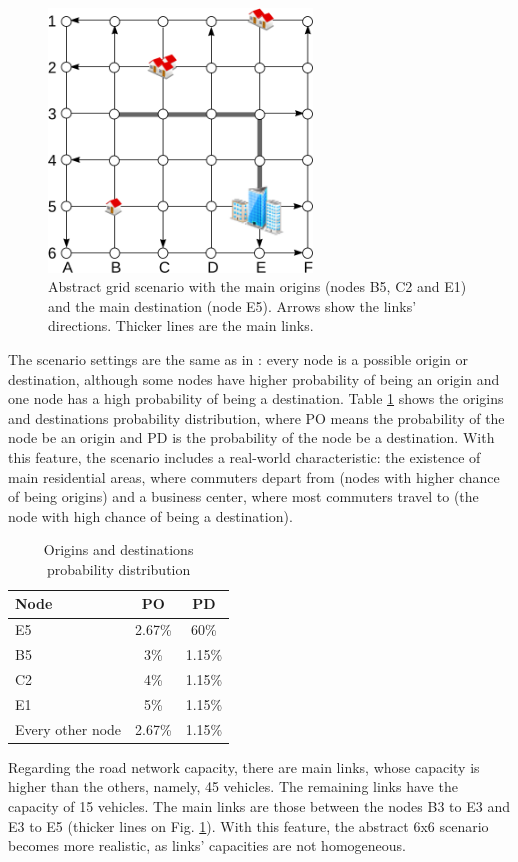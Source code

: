 \documentclass{RITA}
\begin{document}
\begin{figure}[ht]
    \centerline{\includegraphics[width=7cm]{img/6x6grid.png}}
    \caption{Abstract grid scenario with the main origins (nodes B5, C2 and E1) and the main destination (node E5). Arrows show the links' directions. Thicker lines are the main links.}
    \label{fig:6x6grid}
\end{figure} 

The scenario settings are the same as in \cite{Bazzan+2008alamas}: every node is a possible origin or destination, although some nodes have higher probability of being an origin and one node has a high probability of being a destination. Table \ref{tab:odprob} shows the origins and destinations probability distribution, where PO means the probability of the node be an origin and PD is the probability of the node be a destination. With this feature, the scenario includes a real-world characteristic: the existence of main residential areas, where commuters depart from (nodes with higher chance of being origins) and a business center, where most commuters travel to (the node with high chance of being a destination).

{%
\begin{table}[ht]
\begin{center}
\begin{tabular}{|l|c|c|} \hline
Node & PO & PD \\ \hline
E5 & 2.67\% & 60\% \\ \hline
B5 & 3\% & 1.15\% \\ \hline
C2 & 4\% & 1.15\% \\ \hline
E1 & 5\% & 1.15\% \\ \hline
Every other node & 2.67\% & 1.15\% \\ \hline
\end{tabular}
\caption{Origins and destinations probability distribution}\label{tab:odprob}
\end{center}
\end{table}
}%
Regarding the road network capacity, there are main links, whose capacity is higher than the others, namely, 45 vehicles. The remaining links have the capacity of 15 vehicles. The main links are those between the nodes B3 to E3 and E3 to E5 (thicker lines on Fig. \ref{fig:6x6grid}). With this feature, the abstract 6x6 scenario becomes more realistic, as links' capacities are not homogeneous.
\end{document}
